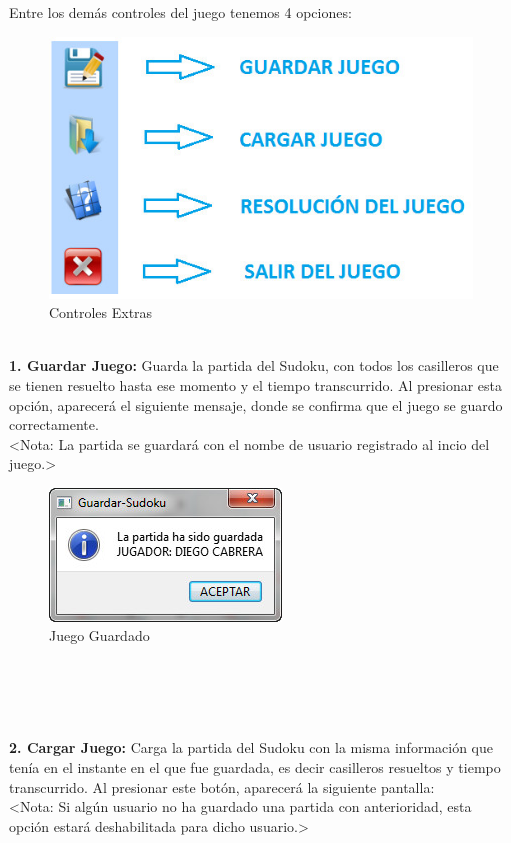 \ \\ \ \\ \ \\ \ \\ \ \\ \ \\ \ \\
Entre los demás controles del juego tenemos 4 opciones:

\begin{figure}[htbp]
\begin{center}
\includegraphics[width=.60\textwidth]{./imagenes/Controles2.png}
\caption{Controles Extras}
\label{Controles Extras}
\end{center}
\end{figure} 

\ \\ \textbf{1. Guardar Juego:} Guarda la partida del Sudoku, con todos los casilleros que se tienen resuelto hasta ese momento y el tiempo transcurrido. Al presionar esta opción, aparecerá el siguiente mensaje, donde se confirma que el juego se guardo correctamente. \\
<Nota: La partida se guardará con el nombe de usuario registrado al incio del juego.>
  
\begin{figure}[htbp]
\begin{center}
\includegraphics[width=.40\textwidth]{./imagenes/Guardar.png}
\caption{Juego Guardado}
\label{Juego Guardado}
\end{center}
\end{figure} 

\ \\ \ \\ \ \ \\ \ \\ 
\textbf{2. Cargar Juego:} Carga la partida del Sudoku con la misma información que tenía en el instante en el que fue guardada, es decir casilleros resueltos y tiempo transcurrido. Al presionar este botón, aparecerá la siguiente pantalla: \\ 
<Nota: Si algún usuario no ha guardado una partida con anterioridad, esta opción estará deshabilitada para dicho usuario.>

